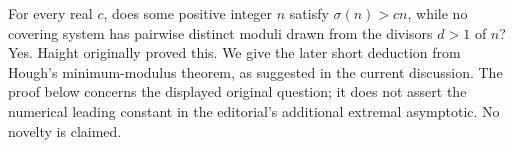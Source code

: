 For every real $c$, does some positive integer $n$ satisfy $\sigma(n)>cn$, while no covering system has pairwise distinct moduli drawn from the divisors $d>1$ of $n$? Yes. Haight originally proved this. We give the later short deduction from Hough's minimum-modulus theorem, as suggested in the current discussion. The proof below concerns the displayed original question; it does not assert the numerical leading constant in the editorial's additional extremal asymptotic. No novelty is claimed.
